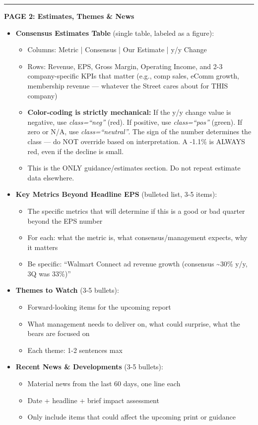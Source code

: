 \documentclass[11pt]{article}
\begin{document}
\vspace{0.5em}\hrule\vspace{0.5em}

\textbf{PAGE 2: Estimates, Themes \& News}


\begin{itemize}[leftmargin=*,itemsep=2pt,topsep=2pt]
\item {} \textbf{Consensus Estimates Table} (single table, labeled as a figure):
\begin{itemize}[leftmargin=*,itemsep=2pt,topsep=2pt]
\item {} Columns: Metric | Consensus | Our Estimate | y/y Change
\item {} Rows: Revenue, EPS, Gross Margin, Operating Income, and 2-3 company-specific KPIs that matter (e.g., comp sales, eComm growth, membership revenue — whatever the Street cares about for THIS company)
\item {} \textbf{Color-coding is strictly mechanical:} If the y/y change value is negative, use \emph{class=``neg''} (red). If positive, use \emph{class=``pos''} (green). If zero or N/A, use \emph{class=``neutral''}. The sign of the number determines the class — do NOT override based on interpretation. A -1.1\% is ALWAYS red, even if the decline is small.
\item {} This is the ONLY guidance/estimates section. Do not repeat estimate data elsewhere.
\end{itemize}
\item {} \textbf{Key Metrics Beyond Headline EPS} (bulleted list, 3-5 items):
\begin{itemize}[leftmargin=*,itemsep=2pt,topsep=2pt]
\item {} The specific metrics that will determine if this is a good or bad quarter beyond the EPS number
\item {} For each: what the metric is, what consensus/management expects, why it matters
\item {} Be specific: ``Walmart Connect ad revenue growth (consensus \textasciitilde{}30\% y/y, 3Q was 33\%)''
\end{itemize}
\item {} \textbf{Themes to Watch} (3-5 bullets):
\begin{itemize}[leftmargin=*,itemsep=2pt,topsep=2pt]
\item {} Forward-looking items for the upcoming report
\item {} What management needs to deliver on, what could surprise, what the bears are focused on
\item {} Each theme: 1-2 sentences max
\end{itemize}
\item {} \textbf{Recent News \& Developments} (3-5 bullets):
\begin{itemize}[leftmargin=*,itemsep=2pt,topsep=2pt]
\item {} Material news from the last 60 days, one line each
\item {} Date + headline + brief impact assessment
\item {} Only include items that could affect the upcoming print or guidance
\end{itemize}
\end{itemize}
\end{document}
